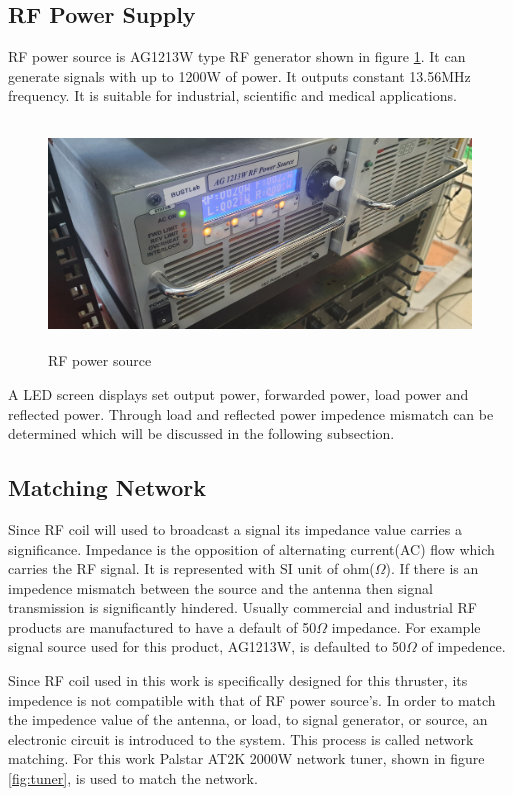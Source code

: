 \subsection{RF Power Supply}
RF power source is AG1213W type RF generator shown in figure \ref{fig:rfpowersup}. It can generate signals with up to 1200W of power. It outputs constant 13.56MHz frequency. It is suitable for industrial, scientific and medical applications.

\begin{figure}[ht]
    \centering
    \includegraphics[height=6cm]{fig/rfpowersup.jpg}
    \caption{RF power source}
    \label{fig:rfpowersup}
\end{figure}

A LED screen displays set output power, forwarded power, load power and reflected power. Through load and reflected power impedence mismatch can be determined which will be discussed in the following subsection.

\subsection{Matching Network} \label{ch:Ch4_mn}
Since RF coil will used to broadcast a signal its impedance value carries a significance. Impedance is the opposition of alternating current(AC) flow which carries the RF signal\cite{slurzberg1950essentials}. It is represented with SI unit of ohm($\Omega$). If there is an impedence mismatch between the source and the antenna then signal transmission is significantly hindered. Usually commercial and industrial RF products are manufactured to have a default of 50$\Omega$ impedance. For example signal source used for this product, AG1213W, is defaulted to 50$\Omega$ of impedence.

Since RF coil used in this work is specifically designed for this thruster, its impedence is not compatible with that of RF power source's. In order to match the impedence value of the antenna, or load, to signal generator, or source, an electronic circuit is introduced to the system. This process is called network matching. For this work Palstar AT2K 2000W network tuner, shown in figure \ref{fig:tuner}, is used to match the network.


